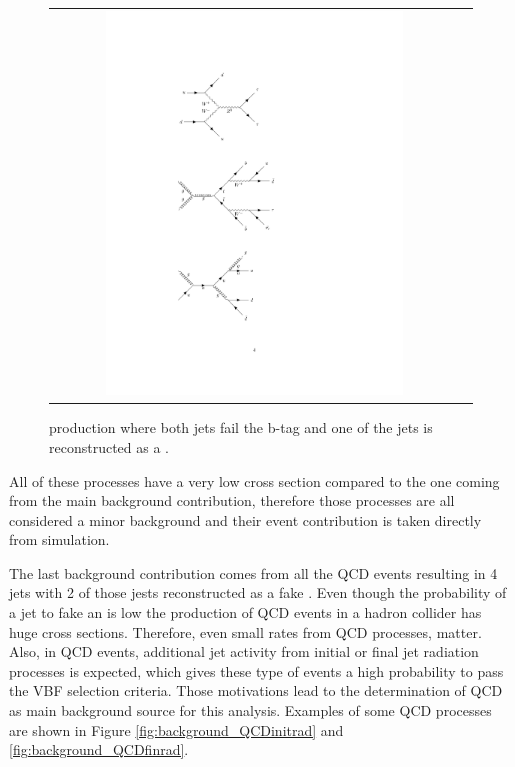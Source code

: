 \begin{figure}[tbh!]
	\centering
	\begin{tabular}{cc}
		\includegraphics[width=0.75\textwidth]{diagrams/pics/background_ttbar.pdf}
	\end{tabular}
	\caption{\ttbar production where both jets fail the b-tag and one of the jets is reconstructed as a \hadtaufake.}
	\label{fig:background_ttbar}
\end{figure}

All of these processes have a very low cross section compared to the one coming from the main background contribution, therefore those processes are all considered a minor background and their event contribution is taken directly from simulation.

The last background contribution comes from all the QCD events resulting in 4 jets with 2 of those jests reconstructed as a fake \hadtau. Even though the probability of a jet to fake an \hadtau is low the production of QCD events in a hadron collider has huge cross sections. Therefore, even small \hadtaufake rates from QCD processes, matter. Also, in QCD events, additional jet activity from initial or final jet radiation processes is expected, which gives these type of events a high probability to pass the VBF selection criteria. Those motivations lead to the determination of QCD as main background source for this analysis. Examples of some QCD processes are shown in Figure \ref{fig:background_QCDinitrad} and \ref{fig:background_QCDfinrad}.

